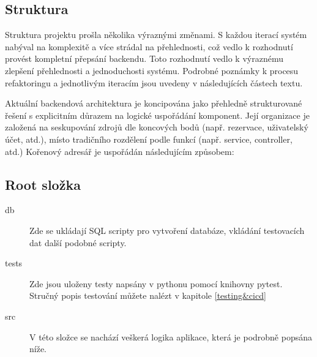 
\subsection{Struktura}
Struktura projektu prošla několika výraznými změnami. S každou iterací systém nabýval na komplexitě a více strádal na přehlednosti, což vedlo k rozhodnutí provést kompletní přepsání backendu. Toto rozhodnutí vedlo k výraznému zlepšení přehlednosti a jednoduchosti systému. Podrobné poznámky k procesu refaktoringu a jednotlivým iteracím jsou uvedeny v následujících částech textu.

Aktuální backendová architektura je koncipována jako přehledně strukturované řešení s explicitním důrazem na logické uspořádání komponent. Její organizace je založená na seskupování zdrojů dle koncových bodů (např. rezervace, uživatelský účet, atd.), místo tradičního rozdělení podle funkcí (např. service, controller, atd.)
Kořenový adresář je uspořádán následujícím způsobem:

\subsection{Root složka}
\begin{description}
    \item[db] 
    Zde se ukládají SQL scripty pro vytvoření databáze, vkládání testovacích dat další podobné scripty.
    \item[tests]  
    Zde jsou uloženy testy napsány v pythonu pomocí knihovny pytest. Stručný popis testování můžete nalézt v kapitole \ref{testing&cicd}
    \item[src] 
    V této složce se nachází veškerá logika aplikace, která je podrobně popsána níže.
\end{description}

